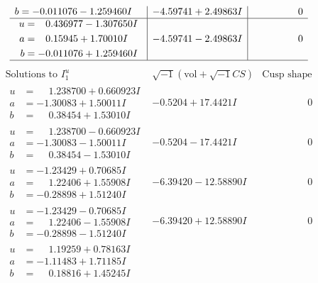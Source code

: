 \documentclass[1p]{elsarticle_modified}
\theoremstyle{definition}
\newcommand{\I}{\sqrt{-1}}
\begin{document}
$$\begin{array}{c|c|c}
\begin{aligned}
b &= -0.011076 - 1.259460 I\end{aligned}
 & -4.59741 + 2.49863 I & \phantom{-0.000000 } 0 \\ \hline\begin{aligned}
u &= \phantom{-}0.436977 - 1.307650 I \\
a &= \phantom{-}0.15945 + 1.70010 I \\
b &= -0.011076 + 1.259460 I\end{aligned}
 & -4.59741 - 2.49863 I & \phantom{-0.000000 } 0\\
 \hline 
 \end{array}$$\newpage$$\begin{array}{c|c|c}  
\text{Solutions to }I^u_{1}& \I (\text{vol} + \sqrt{-1}CS) & \text{Cusp shape}\\
 \hline 
\begin{aligned}
u &= \phantom{-}1.238700 + 0.660923 I \\
a &= -1.30083 + 1.50011 I \\
b &= \phantom{-}0.38454 + 1.53010 I\end{aligned}
 & -0.5204 + 17.4421 I & \phantom{-0.000000 } 0 \\ \hline\begin{aligned}
u &= \phantom{-}1.238700 - 0.660923 I \\
a &= -1.30083 - 1.50011 I \\
b &= \phantom{-}0.38454 - 1.53010 I\end{aligned}
 & -0.5204 - 17.4421 I & \phantom{-0.000000 } 0 \\ \hline\begin{aligned}
u &= -1.23429 + 0.70685 I \\
a &= \phantom{-}1.22406 + 1.55908 I \\
b &= -0.28898 + 1.51240 I\end{aligned}
 & -6.39420 - 12.58890 I & \phantom{-0.000000 } 0 \\ \hline\begin{aligned}
u &= -1.23429 - 0.70685 I \\
a &= \phantom{-}1.22406 - 1.55908 I \\
b &= -0.28898 - 1.51240 I\end{aligned}
 & -6.39420 + 12.58890 I & \phantom{-0.000000 } 0 \\ \hline\begin{aligned}
u &= \phantom{-}1.19259 + 0.78163 I \\
a &= -1.11483 + 1.71185 I \\
b &= \phantom{-}0.18816 + 1.45245 I\end{aligned}

\end{array}$$
\end{document}
